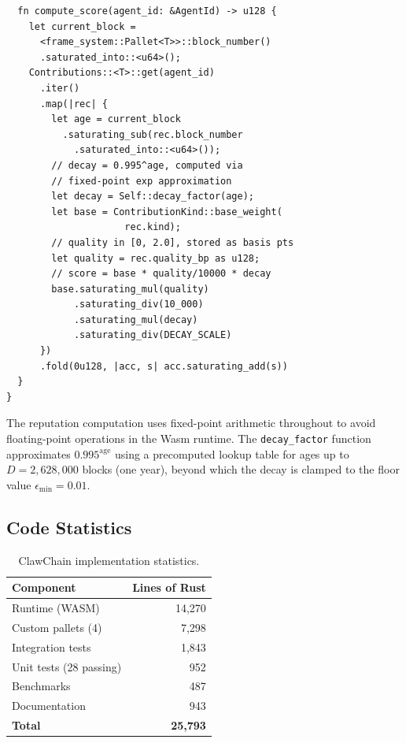 \documentclass[conference]{IEEEtran}
\begin{document}
\begin{lstlisting}
  fn compute_score(agent_id: &AgentId) -> u128 {
    let current_block =
      <frame_system::Pallet<T>>::block_number()
      .saturated_into::<u64>();
    Contributions::<T>::get(agent_id)
      .iter()
      .map(|rec| {
        let age = current_block
          .saturating_sub(rec.block_number
            .saturated_into::<u64>());
        // decay = 0.995^age, computed via
        // fixed-point exp approximation
        let decay = Self::decay_factor(age);
        let base = ContributionKind::base_weight(
                     rec.kind);
        // quality in [0, 2.0], stored as basis pts
        let quality = rec.quality_bp as u128;
        // score = base * quality/10000 * decay
        base.saturating_mul(quality)
            .saturating_div(10_000)
            .saturating_mul(decay)
            .saturating_div(DECAY_SCALE)
      })
      .fold(0u128, |acc, s| acc.saturating_add(s))
  }
}
\end{lstlisting}

The reputation computation uses fixed-point arithmetic throughout to avoid floating-point operations in the Wasm runtime. The \texttt{decay\_factor} function approximates $0.995^{\text{age}}$ using a precomputed lookup table for ages up to $D = 2{,}628{,}000$ blocks (one year), beyond which the decay is clamped to the floor value $\epsilon_{\min} = 0.01$.

\subsection{Code Statistics}

\begin{table}[t]
\centering
\begin{tabular}{lr}
\toprule
\textbf{Component} & \textbf{Lines of Rust} \\
\midrule
Runtime (WASM) & 14,270 \\
Custom pallets (4) & 7,298 \\
Integration tests & 1,843 \\
Unit tests (28 passing) & 952 \\
Benchmarks & 487 \\
Documentation & 943 \\
\midrule
\textbf{Total} & \textbf{25,793} \\
\bottomrule
\end{tabular}
\caption{ClawChain implementation statistics.}
\label{tab:code}
\end{table}

\end{document}
